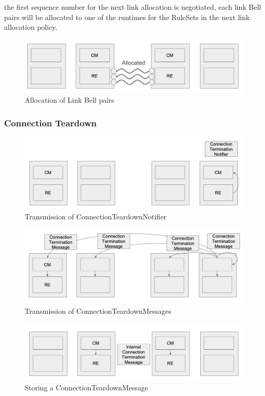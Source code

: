 the first sequence number for the next link allocation is negotiated, each link Bell pairs will be allocated to one of the runtimes for the RuleSets in the next link allocation policy.
\begin{figure}[H]
  \centerline{\includegraphics[width=\columnwidth]{images/link_allocation.png}}
  \caption{Allocation of Link Bell pairs}
\end{figure}

\subsubsection{Connection Teardown}


\begin{figure}[H]
  \centerline{\includegraphics[width=\columnwidth]{images/connection_teardown_notifier.png}}
  \caption{Transmission of ConnectionTeardownNotifier}
\end{figure}

\begin{figure}[H]
  \centerline{\includegraphics[width=\columnwidth]{images/connection_teardown_message.png}}
  \caption{Transmission of ConnectionTeardownMessages}
\end{figure}

\begin{figure}[H]
  \centerline{\includegraphics[width=\columnwidth]{images/internal_connection_teardown_message.png}}
  \caption{Storing a ConnectionTeardownMessage}
\end{figure}

